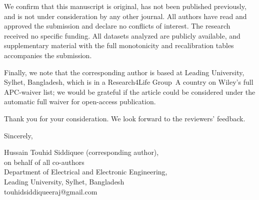 \documentclass[11pt,a4paper]{article}
\begin{document}
We confirm that this manuscript is original, has not been published previously, and is not under consideration by any other journal. All authors have read and approved the submission and declare no conflicts of interest. The research received no specific funding. All datasets analyzed are publicly available, and supplementary material with the full monotonicity and recalibration tables accompanies the submission.

Finally, we note that the corresponding author is based at Leading University, Sylhet, Bangladesh, which is in a Research4Life Group~A country on Wiley's full APC-waiver list; we would be grateful if the article could be considered under the automatic full waiver for open-access publication.

Thank you for your consideration. We look forward to the reviewers' feedback.

\medskip
Sincerely,

\medskip
Hussain Touhid Siddiquee (corresponding author),\\
on behalf of all co-authors\\
Department of Electrical and Electronic Engineering,\\
Leading University, Sylhet, Bangladesh\\
\mbox{touhidsiddiqueeraj@gmail.com}
\end{document}
